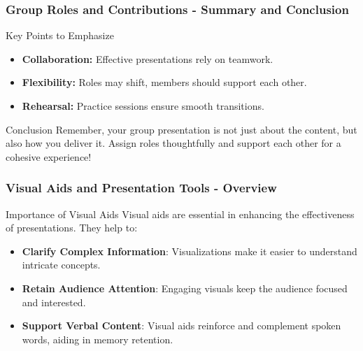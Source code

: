 \documentclass{beamer}
\begin{document}
\begin{frame}[fragile]
    \frametitle{Group Roles and Contributions - Summary and Conclusion}
    \begin{block}{Key Points to Emphasize}
        \begin{itemize}
            \item \textbf{Collaboration:} Effective presentations rely on teamwork.
            \item \textbf{Flexibility:} Roles may shift, members should support each other.
            \item \textbf{Rehearsal:} Practice sessions ensure smooth transitions.
        \end{itemize}
    \end{block}

    \begin{block}{Conclusion}
        Remember, your group presentation is not just about the content, but also how you deliver it. Assign roles thoughtfully and support each other for a cohesive experience!
    \end{block}
\end{frame}

\begin{frame}[fragile]
    \frametitle{Visual Aids and Presentation Tools - Overview}
    \begin{block}{Importance of Visual Aids}
        Visual aids are essential in enhancing the effectiveness of presentations. They help to:
        \begin{itemize}
            \item \textbf{Clarify Complex Information}: Visualizations make it easier to understand intricate concepts.
            \item \textbf{Retain Audience Attention}: Engaging visuals keep the audience focused and interested.
            \item \textbf{Support Verbal Content}: Visual aids reinforce and complement spoken words, aiding in memory retention.
        \end{itemize}
    \end{block}
\end{frame}
\end{document}
